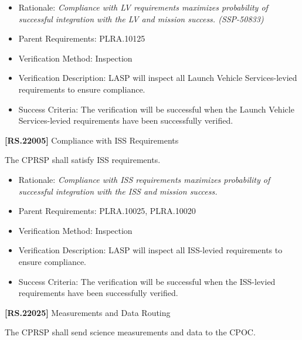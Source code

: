 \documentclass[12pt,oneside,oldfontcommands]{memoir}
\begin{document}
\begin{itemize}
\item{} Rationale: \emph{Compliance with LV requirements maximizes probability of successful integration with the LV and mission success. (SSP-50833)}

\item{} Parent Requirements: PLRA.10125

\item{} Verification Method: Inspection

\item{} Verification Description: \gls{LASP} will inspect all Launch Vehicle Services-levied requirements to ensure compliance.

\item{} Success Criteria: The verification will be successful when the Launch Vehicle Services-levied requirements have been successfully verified.

\end{itemize}

\textbf{[RS.22005]} Compliance with \gls{ISS} Requirements

The \gls{CPRSP} shall satisfy \gls{ISS} requirements.

\begin{itemize}
\item{} Rationale: \emph{Compliance with ISS requirements maximizes probability of successful integration with the ISS and mission success.}

\item{} Parent Requirements: PLRA.10025, PLRA.10020

\item{} Verification Method: Inspection

\item{} Verification Description: \gls{LASP} will inspect all \gls{ISS}-levied requirements to ensure compliance.

\item{} Success Criteria: The verification will be successful when the \gls{ISS}-levied requirements have been successfully verified.

\end{itemize}

\textbf{[RS.22025]} Measurements and Data Routing

The \gls{CPRSP} shall send science \gls{measure}ments and data to the \gls{CPOC}.
\end{document}
